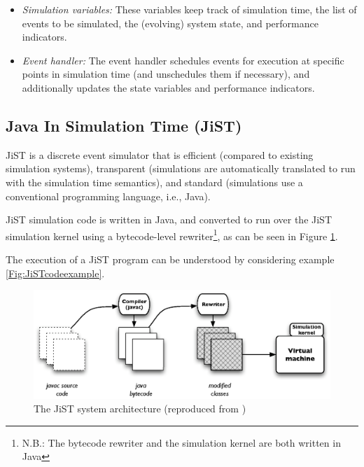 \begin{itemize}
  \item \emph{Simulation variables:} These variables keep track of simulation 
  time, the list of events to be simulated, the (evolving) system state, and 
  performance indicators.
  \item \emph{Event handler:} The event handler schedules events for execution 
  at specific points in simulation time (and unschedules them if necessary), 
  and additionally updates the state variables and performance indicators.
\end{itemize}
 
\subsection{Java In Simulation Time (JiST)} \label{subsec:jist}

JiST \cite{barr_JIST:2005} is a discrete event simulator that is 
efficient (compared to existing simulation systems), 
transparent (simulations are automatically translated to run with the 
simulation time semantics), and standard (simulations use a
conventional programming language, i.e., Java).

JiST simulation code is written in Java, and converted to run over the JiST 
simulation kernel using a bytecode-level rewriter\footnote{N.B.: The bytecode 
rewriter and the simulation kernel are both written in Java},  as can be seen 
in Figure \ref{Fig:JiST_architecture}.

The execution of a JiST program can be understood by considering example 
\ref{Fig:JiSTcodeexample}.
\begin{figure} 
\centering
\label{Fig:JiST_architecture}
\includegraphics[scale=0.72]{img/JiST_architecture.eps} \caption[The JiST 
System Architecture]{The JiST system architecture (reproduced from
\cite{barr_JIST:2005})}
\end{figure} 

